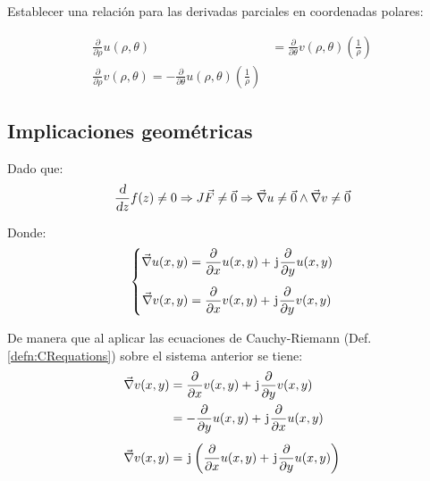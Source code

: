 Establecer una relación para las derivadas parciales en coordenadas polares:

\begin{mdframed}[style=DefinitionFrame]
    \begin{defn}
        \label{defn:CRpolarEquations}
    \end{defn}
    \begin{align*}
        \frac{\partial}{\partial \rho} u(\rho,\theta) &= \frac{\partial}{\partial \theta}  v(\rho,\theta) \left( \frac{1}{\rho} \right)
        \\[1em]
        \frac{\partial}{\partial \rho} v(\rho,\theta) = - \frac{\partial}{\partial \theta} u(\rho,\theta) \left( \frac{1}{\rho} \right)
    \end{align*}
\end{mdframed}


\subsection{Implicaciones geométricas}

Dado que:
\begin{equation*}
    \frac{\textsl{d}}{\textsl{d} z} f(z) \neq 0 \Rightarrow  J \Vec{F} \neq \Vec{0} \Rightarrow \Vec{\nabla} u \neq \Vec{0} \land \Vec{\nabla} v \neq \Vec{0}
\end{equation*}

Donde:
\begin{equation*}
    \left\{
    \begin{aligned}
        \Vec{\nabla} u(x,y) &= \frac{\partial}{\partial x} u(x,y) + \mkern2mu\mathrm{j}\mkern1mu \frac{\partial}{\partial y} u(x,y)
        \\[1ex]
        \Vec{\nabla} v(x,y) &= \frac{\partial}{\partial x} v(x,y) + \mkern2mu\mathrm{j}\mkern1mu \frac{\partial}{\partial y} v(x,y)
    \end{aligned}
    \right.
\end{equation*}

De manera que al aplicar las ecuaciones de Cauchy-Riemann (Def. \ref{defn:CRequations}) sobre el sistema anterior se tiene:
\begin{align*}
    \Vec{\nabla} v(x,y) &= \frac{\partial}{\partial x} v(x,y) + \mkern2mu\mathrm{j}\mkern1mu \frac{\partial}{\partial y} v(x,y)
    \\
    &= - \frac{\partial}{\partial y} u(x,y) + \mkern2mu\mathrm{j}\mkern1mu \frac{\partial}{\partial x} u(x,y)
    \\[1ex]
    \Vec{\nabla} v(x,y) &= \mkern2mu\mathrm{j}\mkern1mu \left( \frac{\partial}{\partial x} u(x,y) + \mkern2mu\mathrm{j}\mkern1mu \frac{\partial}{\partial y} u(x,y) \right)
\end{align*}

